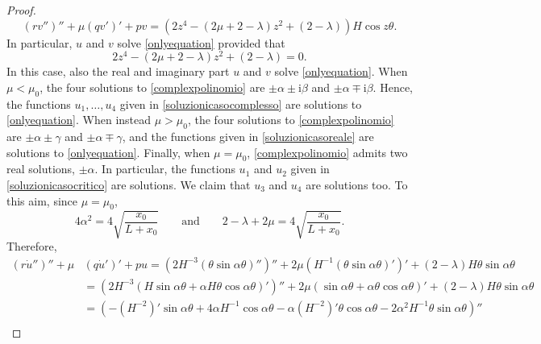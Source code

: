\documentclass[10pt,a4paper]{amsart}
\begin{document}
\begin{proof}
\begin{equation*}
\left(r  v''\right)''+ \mu\left(q  v'\right)' + pv=\left(2z^4-(2\mu+2-\lambda)z^2+(2-\lambda)\right)H\cos z\theta.
\end{equation*}
In particular, $u$ and $v$ solve \eqref{onlyequation} provided that 
\begin{equation}\label{complexpolinomio}
2z^4-(2\mu+2-\lambda)z^2+(2-\lambda)=0.
\end{equation}
In this case, also the real and imaginary part $u$ and $v$ solve \eqref{onlyequation}. When $\mu<\mu_0$, the four solutions to \eqref{complexpolinomio} are $\pm\alpha\pm\mathrm i \beta$ and $\pm\alpha\mp \mathrm i \beta.$ Hence, the functions $u_1,\ldots,u_4$ given in \eqref{soluzionicasocomplesso} are solutions to \eqref{onlyequation}. When instead $\mu>\mu_0$, the four solutions to \eqref{complexpolinomio} are $\pm\alpha\pm\gamma$ and $\pm\alpha\mp\gamma$, and the functions given in \eqref{soluzionicasoreale} are solutions to \eqref{onlyequation}.
Finally, when $\mu=\mu_0$, \eqref{complexpolinomio} admits two real solutions, $\pm\alpha$. In particular, the functions $u_1$ and $u_2$ given in \eqref{soluzionicasocritico} are solutions. We claim that $u_3$ and $u_4$ are solutions too. To this aim, since $\mu=\mu_0$,
\begin{equation}\label{auxcomputcritic}
4\alpha^2=4\sqrt{\frac{x_0}{L+x_0}}\qquad\text{and}\qquad 2-\lambda+2\mu=4\sqrt{\frac{x_0}{L+x_0}}.
\end{equation}
Therefore,
\begin{equation*}      \begin{split}          \left(r \dot u''\right)''+ \mu&\left(q \dot u'\right)' + pu=\left(2H^{-3}(\theta\sin\alpha\theta)''\right)''+2\mu\left(H^{-1}(\theta\sin\alpha\theta)'\right)'+(2-\lambda)H\theta\sin\alpha\theta\\
	&=\left(2H^{-3}(H\sin\alpha\theta+\alpha H\theta\cos\alpha\theta)'\right)''+2\mu\left(\sin\alpha\theta+\alpha\theta\cos\alpha\theta\right)'+(2-\lambda)H\theta\sin\alpha\theta\\
	&=\left(-\left(H^{-2}\right)'\sin\alpha\theta+4\alpha H^{-1}\cos\alpha\theta-\alpha \left(H^{-2}\right)'\theta\cos\alpha\theta-2\alpha^2 H^{-1}\theta\sin\alpha\theta\right)''\\

\end{split}
\end{equation*}
\end{proof}
\end{document}
